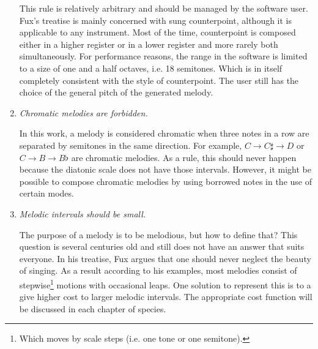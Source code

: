 \begin{enumerate}[wide, label=\bfseries G\arabic*]
    This rule is relatively arbitrary and should be managed by the software user. Fux's treatise is mainly concerned with sung counterpoint, although it is applicable to any instrument. Most of the time, counterpoint is composed either in a higher register or in a lower register and more rarely both simultaneously. For performance reasons, the range in the software is limited to a size of one and a half octaves, i.e. 18 semitones. Which is in itself completely consistent with the style of counterpoint. The user still has the choice of the general pitch of the generated melody.

    \item \textit{Chromatic melodies are forbidden.}\label{rule:chromafb}

    In this work, a melody is considered chromatic when three notes in a row are separated by semitones in the same direction. For example, $C\to C\sharp\to D$ or $C\to B\to B\flat$ are chromatic melodies. As a rule, this should never happen because the diatonic scale does not have those intervals. However, it might be possible to compose chromatic melodies by using borrowed notes in the use of certain modes.
    
    \item \textit{Melodic intervals should be small.}\label{rule:smallmelody}

    The purpose of a melody is to be melodious, but how to define that? This question is several centuries old and still does not have an answer that suits everyone.
    In his treatise, Fux argues that one should never neglect the beauty of singing. As a result according to his examples, most melodies consist of stepwise\footnote{Which moves by scale steps (i.e. one tone or one semitone)\parencite{Step}.} motions with occasional leaps. One solution to represent this is to a give higher cost to larger melodic intervals. The appropriate cost function will be discussed in each chapter of species.
    

\end{enumerate}


